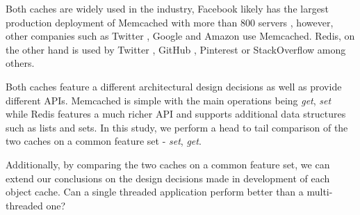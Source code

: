 Both caches are widely used in the industry, Facebook likely has the largest production deployment of Memcached with more than 800 servers \cite{scalingMemcachedAtFacebook}, however, other companies such as Twitter \cite{twitterMemcached}, Google \cite{googleCloudMemache} and Amazon \cite{awsMemcached} use Memcached. Redis, on the other hand is used by Twitter \cite{redisTwitterRealTime}, GitHub \cite{redisGithub}, Pinterest \cite{redisPinterest} or StackOverflow \cite{redisStackOverflow} among others.

Both caches feature a different architectural design decisions as well as provide different APIs. Memcached is simple with the main operations being \textit{get}, \textit{set} while Redis features a much richer API and supports additional data structures such as lists and sets. In this study, we perform a head to tail comparison of the two caches on a common feature set - \textit{set}, \textit{get}.

Additionally, by comparing the two caches on a common feature set, we can extend our conclusions on the design decisions made in development of each object cache. Can a single threaded application perform better than a multi-threaded one?